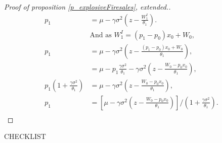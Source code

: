 \documentclass[11pt]{article}
\begin{document}
\begin{proof}[Proof of proposition \ref{p_explosiveFiresales}, extended.]
\begin{align*}
p_1 &= \mu - \gamma\sigma^2 \left(z-\frac{W^I_1}{\theta_1}\right).\\
&\text{And as } W_1^I = (p_1 - p_0)x_0 + W_0,\\
p_1 &= \mu - \gamma\sigma^2 \left(z-\frac{(p_1 - p_0)x_0 + W_0}{\theta_1}\right),\\
 &= \mu - p_1\frac{\gamma\sigma^2}{\theta_1} - \gamma\sigma^2 \left(z-\frac{W_0 - p_0x_0}{\theta_1}\right),\\
p_1(1+\frac{\gamma\sigma^2}{\theta_1}) &= \mu - \gamma\sigma^2 \left(z-\frac{W_0 - p_0x_0}{\theta_1}\right),\\
p_1 &= \left[\mu - \gamma\sigma^2 \left(z-\frac{W_0 - p_0x_0}{\theta_1}\right)\right]/(1+\frac{\gamma\sigma^2}{\theta_1}).\\
\end{align*}
\end{proof}

\newpage
CHECKLIST
\end{document}
